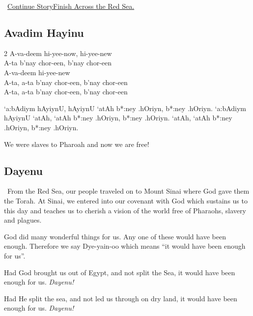 \documentclass[12pt]{article}
\newenvironment{hebrewPrayer}
    {\begin{cjhebrew}
     \Large
    }
    { 
    \end{cjhebrew}
    }
\newenvironment{hebrewTransliteration}{}{\par}
\newenvironment{hebrewTranslation}{}{\par}
\newcommand{\god}{God}
\newcommand{\inlineSederAction}[1]{\faHandORight{}~\underline{#1}}
\newcommand{\sederAction}[1]{\inlineSederAction{#1}\par}
\newcommand{\newReading}{\faBook{}\ }
\begin{document}
\sederAction{Continue Story\textemdash{}Finish Across the Red Sea.}

\begin{minipage}[t]{\textwidth}
\subsection*{Avadim Hayinu}
\begin{multicols}{2}
\begin{hebrewTransliteration}
    A-va-deem hi-yee-now, hi-yee-new \\
    A-ta b'nay chor-een, b'nay chor-een \\
    A-va-deem hi-yee-new\\
    A-ta, a-ta b'nay chor-een, b'nay chor-een \\
    A-ta, a-ta b'nay chor-een, b'nay chor-een
\end{hebrewTransliteration}
\vfill\null
\columnbreak
\begin{hebrewPrayer}
    `a:bAdiym hAyiynU\textrm{,} hAyiynU `atAh b*:ney .hOriyn\textrm{,} b*:ney .hOriyn\textrm{.} `a:bAdiym hAyiynU `atAh\textrm{,} `atAh b*:ney .hOriyn\textrm{,} b*:ney .hOriyn\textrm{.} `atAh\textrm{,} `atAh b*:ney .hOriyn\textrm{,} b*:ney .hOriyn\textrm{.}
\end{hebrewPrayer}
\end{multicols}
\begin{hebrewTranslation}
    We were slaves to Pharoah and now we are free!
\end{hebrewTranslation}
\end{minipage}

\subsection*{Dayenu}
\newReading From the Red Sea, our people traveled on to Mount Sinai where God gave them the Torah. At Sinai, we entered into our covenant with {\god} which sustains us to this day and teaches us to cherish a vision of the world free of Pharaohs, slavery and plagues.

{\god} did many wonderful things for us. Any one of these would have been enough. Therefore we say Dye-yain-oo which means ``it would have been enough for us''.

Had {\god} brought us out of Egypt, and not split the Sea, it would have been enough for us. \textit{Dayenu!}

Had He split the sea, and not led us through on dry land, it would have been enough for us. \textit{Dayenu!}
\end{document}

